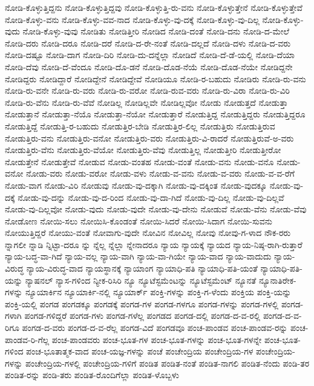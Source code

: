 {ನೋಡಿ-ಕೊಳ್ಳುತ್ತಿದ್ದನು
ನೋಡಿ-ಕೊಳ್ಳುತ್ತಿದ್ದವು
ನೋಡಿ-ಕೊಳ್ಳುತ್ತಿ-ರು-ವನು
ನೋಡಿ-ಕೊಳ್ಳುತ್ತೇನೆ
ನೋಡಿ-ಕೊಳ್ಳುತ್ತೇವೆ
ನೋಡಿ-ಕೊಳ್ಳು-ವನು
ನೋಡಿ-ಕೊಳ್ಳು-ವವ-ನಾದ
ನೋಡಿ-ಕೊಳ್ಳು-ವು-ದಕ್ಕೆ
ನೋಡಿ-ಕೊಳ್ಳು-ವು-ದಿಲ್ಲ
ನೋಡಿ-ಕೊಳ್ಳು-ವುದು
ನೋಡಿ-ಕೊಳ್ಳು-ವುವು
ನೋಡಿತು
ನೋಡಿತ್ತೀರಿ
ನೋಡಿದ
ನೋಡಿ-ದಂತೆ
ನೋಡಿ-ದನು
ನೋಡಿ-ದ-ಮೇಲೆ
ನೋಡಿ-ದರು
ನೋಡಿ-ದರೂ
ನೋಡಿ-ದರೆ
ನೋಡಿ-ದ-ರೇ-ನಂತೆ
ನೋಡಿ-ದಲ್ಲದೆ
ನೋಡಿ-ದಳು
ನೋಡಿ-ದ-ವರು
ನೋಡಿ-ದಷ್ಟೂ
ನೋಡಿ-ದಾಗ
ನೋಡಿ-ದಿರಿ
ನೋಡಿ-ದು-ದನ್ನೆಲ್ಲಾ
ನೋಡಿದೆ
ನೋಡಿ-ದೆ-ಡೆ-ಯಲ್ಲಿ
ನೋಡಿ-ದೆಯಾ
ನೋಡಿ-ದೆವು
ನೋಡಿ-ದೆ-ವೆಂದೂ
ನೋಡಿ-ದೊ-ಡನೆ
ನೋಡಿ-ದೊಡ-ನೆಯೆ
ನೋಡಿ-ದೊಡ-ನೆಯೇ
ನೋಡಿದ್ದನೇ
ನೋಡಿದ್ದರು
ನೋಡಿದ್ದಾರೆ
ನೋಡಿದ್ದೇನೆ
ನೋಡಿದ್ದೇವೆ
ನೋಡಿಯೂ
ನೋಡಿ-ರ-ಬಹುದು
ನೋಡಿರು
ನೋಡಿ-ರು-ವನು
ನೋಡಿ-ರು-ವನೇ
ನೋಡಿ-ರು-ವರು
ನೋಡಿ-ರು-ವರೋ
ನೋಡಿ-ರುವ-ವರು
ನೋಡಿ-ರು-ವಿರಾ
ನೋಡಿ-ರು-ವಿರಿ
ನೋಡಿ-ರು-ವೆನು
ನೋಡಿ-ರು-ವೆವೆ
ನೋಡಿಲ್ಲ
ನೋಡಿಲ್ಲವೇ
ನೋಡಿಲ್ಲವೋ
ನೋಡು
ನೋಡುತ್ತದೆ
ನೋಡುತ್ತಾ
ನೋಡುತ್ತಾನೆ
ನೋಡುತ್ತಾ-ನೆಯೊ
ನೋಡುತ್ತಾ-ನೆಯೋ
ನೋಡುತ್ತಾರೆ
ನೋಡುತ್ತಿದ್ದ
ನೋಡುತ್ತಿದ್ದರು
ನೋಡುತ್ತಿದ್ದರೂ
ನೋಡುತ್ತಿದ್ದೆ
ನೋಡುತ್ತಿ-ರ-ಬಹುದು
ನೋಡುತ್ತಿರ-ಬೇಡಿ
ನೋಡುತ್ತಿರ-ಲಿಲ್ಲ
ನೋಡುತ್ತಿರು
ನೋಡುತ್ತಿರುವ
ನೋಡುತ್ತಿರು-ವನು
ನೋಡುತ್ತಿರು-ವನೋ
ನೋಡುತ್ತಿರು-ವರು
ನೋಡುತ್ತಿರು-ವಿ-ರಾದರೆ
ನೋಡುತ್ತಿರುವೆ-ಅ-ವರು
ನೋಡುತ್ತಿರು-ವೆನು
ನೋಡುತ್ತಿರು-ವೆಯೋ
ನೋಡುತ್ತಿರು-ವೆವು
ನೋಡುತ್ತಿಲ್ಲ
ನೋಡುತ್ತೀರಿ
ನೋಡುತ್ತೀರೋ
ನೋಡುತ್ತೇನೆ
ನೋಡುತ್ತೇವೆ
ನೋಡುವ
ನೋಡು-ವಂತಹ
ನೋಡು-ವಂತೆ
ನೋಡು-ವನು
ನೋಡು-ವನೊ
ನೋಡು-ವನೋ
ನೋಡು-ವರು
ನೋಡು-ವರೋ
ನೋಡು-ವಳು
ನೋಡು-ವ-ವನು
ನೋಡು-ವ-ವರು
ನೋಡು-ವ-ವ-ರೆಗೆ
ನೋಡು-ವಾಗ
ನೋಡು-ವಿರಿ
ನೋಡುವು
ನೋಡು-ವು-ದಕ್ಕಾಗಿ
ನೋಡು-ವು-ದಕ್ಕಿಂತ
ನೋಡು-ವುದಕ್ಕೂ
ನೋಡು-ವು-ದಕ್ಕೆ
ನೋಡು-ವು-ದನ್ನು
ನೋಡು-ವು-ದ-ರಿಂದ
ನೋಡು-ವು-ದಾ-ಗಿದೆ
ನೋಡು-ವು-ದಿಲ್ಲ
ನೋಡು-ವು-ದಿಲ್ಲವೆ
ನೋಡು-ವು-ದಿಲ್ಲವೋ
ನೋಡು-ವುದು
ನೋಡು-ವುದೇ
ನೋಡು-ವು-ದೇನು
ನೋಡುವೆ
ನೋಡು-ವೆನು
ನೋಡು-ವೆವು
ನೋಡೋಣ
ನೋಯಿ-ಸಲು
ನೋಯಿಸಿ-ಕೊಂಡಂತೆ
ನೋಯಿ-ಸಿದರೆ
ನೋಯಿ-ಸಿದಾಗ
ನೋಯಿ-ಸುವನು
ನೋಯುತ್ತಿದ್ದರೆ
ನೋಯು-ವಂತೆ
ನೋವಾಗು-ವುದೇ
ನೋವಿನ
ನೋವಿಲ್ಲ
ನೋವು
ನೋವು-ಗ-ಳಾದ
ನೌಕ-ರರು
ನ್ನಾಗಲೀ
ನ್ನಾಡಿ
ನ್ನಿಟ್ಟಾ-ದರೂ
ನ್ನು
ನ್ನೆಲ್ಲ
ನ್ನೆಲ್ಲಾ
ನ್ನೇನಾದರೂ
ನ್ಯಾಯ
ನ್ಯಾಯಕ್ಕೆ
ನ್ಯಾಯದ
ನ್ಯಾಯ-ನಿಷ್ಠ-ರಾಗಿ-ರುತ್ತಾರೆ
ನ್ಯಾಯ-ಬದ್ಧ-ವಾ-ಗಿದೆ
ನ್ಯಾಯ-ವಲ್ಲ
ನ್ಯಾಯ-ವಾಗಿ
ನ್ಯಾಯ-ವಾ-ಗಿಯೇ
ನ್ಯಾಯ-ವಾದ
ನ್ಯಾಯ-ವಾದುದು
ನ್ಯಾಯ-ವಿರುದ್ಧ
ನ್ಯಾಯ-ವಿರುದ್ಧ-ವಾದ
ನ್ಯಾಯಸ್ಥಾನಕ್ಕೆ
ನ್ಯಾಯಾಂಗ
ನ್ಯಾಯಾಧಿ-ಪತಿ
ನ್ಯಾಯಾಧಿ-ಪತಿ-ಯಂತೆ
ನ್ಯಾಯಾಧಿ-ಪತಿ-ಯನ್ನು
ನ್ಯಾಷನಲ್
ನ್ಯಾಸ-ಗಳಿಂದ
ನ್ಯೀಕ-ರಿಸಿರಿ
ನ್ಯೂ
ನ್ಯೂಟೆಸ್ಟಮೆಂಟನ್ನು
ನ್ಯೂಟೆಸ್ಟಮೆಂಟ್
ನ್ಯೂನತೆ
ನ್ಯೂನಾತಿರೇಕ-ಗಳನ್ನು
ನ್ಯೂಯಾರ್ಕಿನ
ನ್ಯೂಯಾರ್ಕಿ-ನಲ್ಲಿ
ನ್ಯೂಯಾರ್ಕ್
ಪಂಕ್ತಿ-ಗಳನ್ನು
ಪಂಕ್ತಿ-ಗ-ಳೆಂದು
ಪಂಕ್ತಿಯ
ಪಂಕ್ತಿ-ಯನ್ನು
ಪಂಕ್ತಿ-ಯಲ್ಲಿ
ಪಂಗಡ
ಪಂಗಡಕ್ಕೂ
ಪಂಗಡಕ್ಕೆ
ಪಂಗಡ-ಗಳ
ಪಂಗಡ-ಗಳಗೂ
ಪಂಗಡ-ಗಳನ್ನು
ಪಂಗಡ-ಗಳಲ್ಲಿ
ಪಂಗಡ-ಗಳಾಗಿ
ಪಂಗಡ-ಗಳಿದ್ದರೆ
ಪಂಗಡ-ಗಳು
ಪಂಗಡ-ಗಳೆಲ್ಲ
ಪಂಗಡದ
ಪಂಗಡ-ದಲ್ಲಿ
ಪಂಗಡ-ದ-ವ-ರಲ್ಲಿ
ಪಂಗಡ-ದ-ವ-ರಿಗೂ
ಪಂಗಡ-ದ-ವರು
ಪಂಗಡ-ದ-ವ-ರೆಲ್ಲ
ಪಂಗಡ-ವಿದೆ
ಪಂಗಡವೂ
ಪಂಚ-ಪಾಂಡವ
ಪಂಚ-ಪಾಂಡವ-ರನ್ನು
ಪಂಚ-ಪಾಂಡವ-ರಿ-ಗೆಲ್ಲ
ಪಂಚ-ಪಾಂಡವರು
ಪಂಚ-ಭೂತ-ಗಳ
ಪಂಚ-ಭೂತ-ಗಳನ್ನು
ಪಂಚ-ಭೂತ-ಗಳನ್ನೇ
ಪಂಚ-ಭೂತ-ಗಳಿಂದ
ಪಂಚ-ಭೂತಾತ್ಮಕ-ವಾದ
ಪಂಚ-ಯಜ್ಞ-ಗಳನ್ನು
ಪಂಚೆ
ಪಂಚೇಂದ್ರಿಯ
ಪಂಚೇಂದ್ರಿಯ-ಗಳ
ಪಂಚೇಂದ್ರಿಯ-ಗಳನ್ನು
ಪಂಚೇಂದ್ರಿಯ-ಗಳಲ್ಲಿ
ಪಂಚೇಂದ್ರಿಯ-ಗಳಿಗೆ
ಪಂಡಿತ
ಪಂಡಿತ-ನಂತೆ
ಪಂಡಿತ-ನಾಗಲಿ
ಪಂಡಿತ-ನೆಂದು
ಪಂಡಿ-ತರ
ಪಂಡಿತ-ರನ್ನು
ಪಂಡಿ-ತರು
ಪಂಡಿತ-ರೊಂದಿಗೆಲ್ಲಾ
ಪಂಡಿತ-ಳೊಬ್ಬಳು
}
